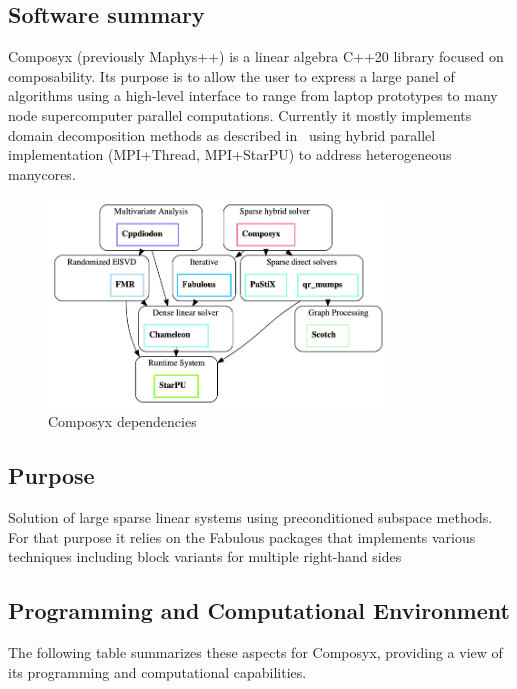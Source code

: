 \subsection{Software summary}
\label{sec:Composyx:summary}
Composyx (previously  Maphys++) is a linear algebra C++20 library focused on composability. Its purpose is to allow the user to express a large panel of algorithms using a high-level interface to range from laptop prototypes to many node supercomputer parallel computations.
Currently it mostly implements domain decomposition methods as described in~\cite{agullo_robust_2019} using hybrid parallel implementation (MPI+Thread, MPI+StarPU) to address heterogeneous manycores.

\begin{figure}
        \centering
        \includegraphics[width=0.8\textwidth]{graphics/composyx/composyx-solverstack.png}
        \caption{Composyx dependencies}
        \label{fig:composyx}
    \end{figure}

\subsection{Purpose}
\label{sec:Composyx:purpose}
Solution of large sparse linear systems using preconditioned subspace methods. For that purpose it relies on the Fabulous packages that implements various techniques including block variants for multiple right-hand sides~\cite{giraud_block_2022}

\subsection{Programming and Computational Environment}
\label{sec::Composyx:environment_capabilities}


The following table summarizes these aspects for Composyx, providing a  view of its programming and computational capabilities.

